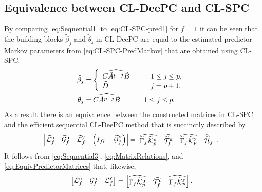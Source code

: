 \subsection{Equivalence between \ac{CL-DeePC} and \ac{CL-SPC}}
By comparing \eqref{eq:Sequential1} to \eqref{eq:CL-SPC-pred1} for $f=1$ it can be seen that the building blocks $\tilde{\beta}_j$ and $\tilde{\theta}_j$ in \ac{CL-DeePC} are equal to the estimated predictor Markov parameters from \eqref{eq:CL-SPC-PredMarkov} that are obtained using \ac{CL-SPC}:
\begin{subequations}\label{eq:EquivMarkov}
	\begin{align}
		\tilde{\beta}_j &=
            \left\{%
            \begin{array}{ll}
			\widehat{C\tilde{A}^{p-j}\tilde{B}} &\qquad 1 \leq j \leq p,\\%
			\widehat{D} &\qquad j=p+1,%
		\end{array}
            \right.\label{eq:EquivMarkovInputs}\\
	\tilde{\theta}_j &= \widehat{C\tilde{A}^{p-j}\tilde{B}} \mkern24mu \qquad 1 \leq j \leq p%
        \label{eq:EquivMarkovOutputs}.
	\end{align}
\end{subequations}
As a result there is an equivalence between the constructed matrices in \ac{CL-SPC} and the efficient sequential \ac{CL-DeePC} method that is succinctly described by
\begin{align}\label{eq:EquivPredictorMatrices}
	\mkern-3mu\begin{bmatrix}
		\widetilde{\mathcal{L}}^\mathrm{u}_f & \widetilde{\mathcal{G}}^\mathrm{u}_f & \widetilde{\mathcal{L}}^\mathrm{y}_f & \left(I_{fl}-\widetilde{\mathcal{G}}^\mathrm{y}_f\right)
	\end{bmatrix}\mkern-3mu=\mkern-3mu\begin{bmatrix}
		\widehat{\widetilde{\Gamma}_f\widetilde{\mathcal{K}}_{p}^{\mathrm{{u}}}} & \widehat{\widetilde{\mathcal{T}}_f^\mathrm{u}} & \widehat{\widetilde{\Gamma}_f\widetilde{\mathcal{K}}_{p}^{\mathrm{{y}}}} & \widehat{\widetilde{\mathcal{H}}}_f
	\end{bmatrix}\mkern-3mu.
\end{align}
It follows from \eqref{eq:Sequential3}, \eqref{eq:MatrixRelations}, and \eqref{eq:EquivPredictorMatrices} that, likewise,
\begin{align}\label{eq:EquivInnovationMatrices}
	\begin{bmatrix}
		\mathcal{L}^\mathrm{u}_f & \mathcal{G}^\mathrm{u}_f & \mathcal{L}^\mathrm{y}_f
	\end{bmatrix}=\begin{bmatrix}
		\widehat{\Gamma_f\widetilde{\mathcal{K}}_{p}^{\mathrm{{u}}}} & \widehat{\mathcal{T}_f^\mathrm{u}} & \widehat{\Gamma_f\widetilde{\mathcal{K}}_{p}^{\mathrm{{y}}}}
	\end{bmatrix}.
\end{align}
